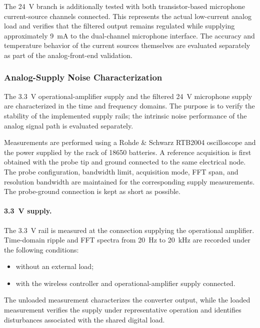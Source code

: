 The 24~V branch is additionally tested with both transistor-based microphone current-source channels connected. This represents the actual low-current analog load and verifies that the filtered output remains regulated while supplying approximately 9~mA to the dual-channel microphone interface. The accuracy and temperature behavior of the current sources themselves are evaluated separately as part of the analog-front-end validation.

\subsubsection{Analog-Supply Noise Characterization}

The 3.3~V operational-amplifier supply and the filtered 24~V microphone supply are characterized in the time and frequency domains. The purpose is to verify the stability of the implemented supply rails; the intrinsic noise performance of the analog signal path is evaluated separately.

Measurements are performed using a Rohde \& Schwarz RTB2004 oscilloscope and the power supplied by the rack of 18650 batteries. A reference acquisition is first obtained with the probe tip and ground connected to the same electrical node. The probe configuration, bandwidth limit, acquisition mode, FFT span, and resolution bandwidth are maintained for the corresponding supply measurements. The probe-ground connection is kept as short as possible.

\paragraph{3.3~V supply.}

The 3.3~V rail is measured at the connection supplying the operational amplifier. Time-domain ripple and FFT spectra from 20~Hz to 20~kHz are recorded under the following conditions:

\begin{itemize}
    \item without an external load;
    \item with the wireless controller and operational-amplifier supply connected.
\end{itemize}

The unloaded measurement characterizes the converter output, while the loaded measurement verifies the supply under representative operation and identifies disturbances associated with the shared digital load.

